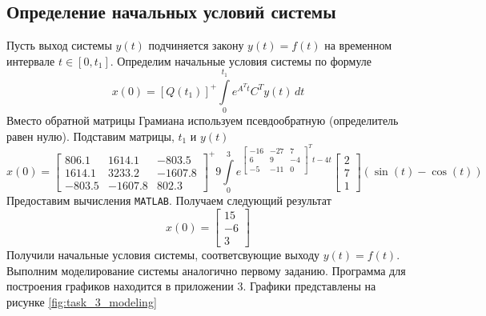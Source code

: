 \documentclass[a4paper, 12pt]{article}
\begin{document}
    \subsection{Определение начальных условий системы}
    Пусть выход системы $y(t)$ подчиняется закону $y(t)=f(t)$ на временном интервале $t\in\left[0,t_1\right]$.
    Определим начальные условия системы по формуле
    $$
    x(0)=\left[Q(t_1)\right]^+\int\limits_{0}^{t_1}e^{A^Tt}C^Ty(t)\,dt
    $$
    Вместо обратной матрицы Грамиана используем псевдообратную (определитель равен нулю).
    Подставим матрицы, $t_1$ и $y(t)$
    $$
    x(0)=\begin{bmatrix}
        806.1	&1614.1	&-803.5\\
        1614.1	 &3233.2	&-1607.8\\
        -803.5	 &-1607.8	&802.3 
    \end{bmatrix}^+9\int\limits_{0}^{3}e^{\begin{bmatrix}
        -16 &-27 &7\\
        6 &9 &-4\\
        -5 &-11 &0
    \end{bmatrix}^Tt-4t}\begin{bmatrix}
        2\\ 7\\ 1
    \end{bmatrix}\left(\sin{(t)}-\cos{(t)}\right)
    $$
    Предоставим вычисления \texttt{MATLAB}. Получаем следующий результат
    $$
    x(0)=\begin{bmatrix}
    15\\
   -6\\
    3
    \end{bmatrix}
    $$
    Получили начальные условия системы, соответсвующие выходу $y(t)=f(t)$. Выполним моделирование системы аналогично первому заданию.
    Программа для построения графиков находится в приложении 3. Графики представлены на рисунке \ref{fig:task_3_modeling}
\end{document}
